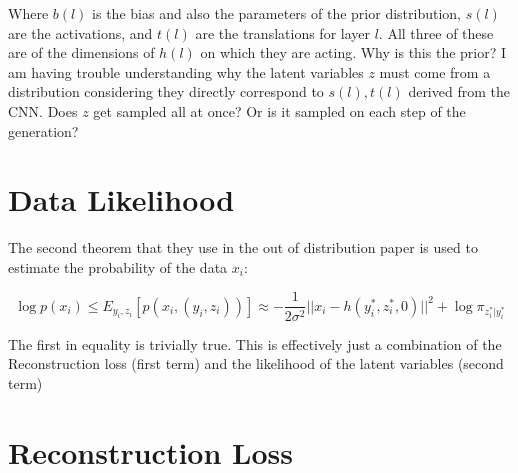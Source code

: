 \documentclass{report}
\begin{document}
	Where $b(l)$ is the bias and also the parameters of the prior distribution, $s(l)$ are the activations, and $t(l)$ are the translations for layer $l$. All three of these are of the dimensions of $h(l)$ on which they are acting. Why is this the prior? I am having trouble understanding why the latent variables $z$ must come from a distribution considering they directly correspond to $s(l), t(l)$ derived from the CNN. Does $z$ get sampled all at once? Or is it sampled on each step of the generation?
	
	\section{Data Likelihood}
	The second theorem that they use in the out of distribution paper is used to estimate the probability of the data $x_i$:
	
	\begin{equation}
	\log p (x_i) \leq E_{y_i, z_i}\left[p\left(x_i, (y_i, z_i)\right)\right] \approx -\frac{1}{2\sigma^2}||x_i - h(y_i^*, z_i^*, 0)||^2 + \log \pi_{z_i^*|y_i^*}
	\end{equation}
	
	The first in equality is trivially true. This is effectively just a combination of the Reconstruction loss (first term) and the likelihood of the latent variables (second term)
	
	\section{Reconstruction Loss}
	
\end{document}
